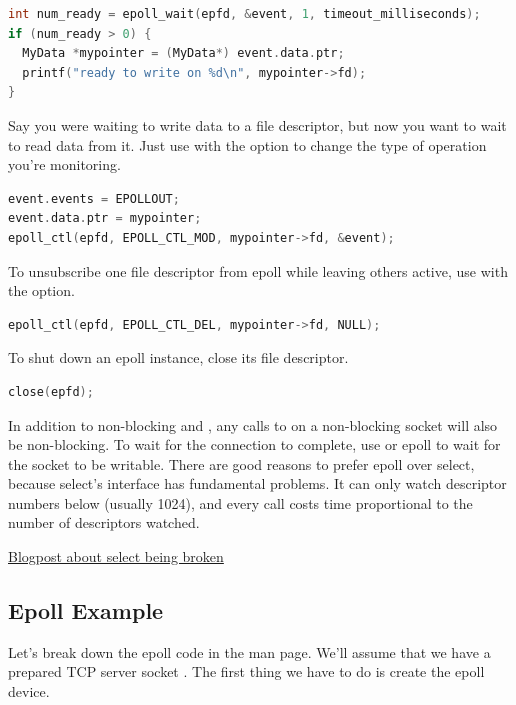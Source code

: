 \begin{lstlisting}[language=C]
int num_ready = epoll_wait(epfd, &event, 1, timeout_milliseconds);
if (num_ready > 0) {
  MyData *mypointer = (MyData*) event.data.ptr;
  printf("ready to write on %d\n", mypointer->fd);
}
\end{lstlisting}

Say you were waiting to write data to a file descriptor, but now you want to wait to read data from it.
Just use  with the  option to change the type of operation you're monitoring.

\begin{lstlisting}[language=C]
event.events = EPOLLOUT;
event.data.ptr = mypointer;
epoll_ctl(epfd, EPOLL_CTL_MOD, mypointer->fd, &event);
\end{lstlisting}

To unsubscribe one file descriptor from epoll while leaving others active, use  with the  option.

\begin{lstlisting}[language=C]
epoll_ctl(epfd, EPOLL_CTL_DEL, mypointer->fd, NULL);
\end{lstlisting}

To shut down an epoll instance, close its file descriptor.

\begin{lstlisting}[language=C]
close(epfd);
\end{lstlisting}

In addition to non-blocking  and , any calls to  on a non-blocking socket will also be non-blocking.
To wait for the connection to complete, use  or epoll to wait for the socket to be writable.
There are good reasons to prefer epoll over select, because select's interface has fundamental problems.
It can only watch descriptor numbers below  (usually 1024), and every call costs time proportional to the number of descriptors watched.

\href{https://idea.popcount.org/2017-01-06-select-is-fundamentally-broken/}{Blogpost about select being broken}

\subsection{Epoll Example}

Let's break down the epoll code in the man page.
We'll assume that we have a prepared TCP server socket .
The first thing we have to do is create the epoll device.

